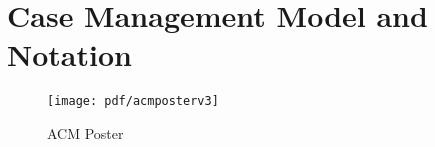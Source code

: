 \section{Case Management Model and Notation}
\begin {figure}[H]
 \centering
 \texttt{[image: pdf/acmposterv3]}
 \caption{ACM Poster} \cite{MasonsofSOA.28.04.2014}
 \end {figure} 